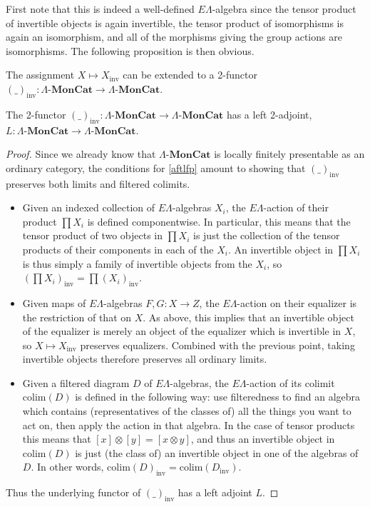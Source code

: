 \documentclass{amsbook} %
\newcommand{\mb}{\mathbf}
\newcommand{\ELAlg}{\lmc}
\newcommand{\lmc}{\Lambda\mbox{-}\mb{MonCat}}
\numberwithin{section}{chapter}
\begin{document}
First note that this is indeed a well-defined $E\Lambda$-algebra since the tensor product of invertible objects is again invertible, the tensor product of isomorphisms is again an isomorphism, and all of the morphisms giving the group actions are isomorphisms. The following proposition is then obvious.


\begin{prop} \label{invprop} The assignment $X \mapsto X_{\mathrm{inv}}$ can be extended to a 2-functor $(\_)_{\mathrm{inv}}: \ELAlg \to \ELAlg$.
\end{prop}


\begin{prop} \label{invadj} The 2-functor $(\_)_{\mathrm{inv}}: \ELAlg \to \ELAlg$ has a left 2-adjoint, $L: \ELAlg \to \ELAlg$.
\end{prop}
\begin{proof} Since we already know that $\ELAlg$ is locally finitely presentable as an ordinary category, the conditions for \cref{aftlfp} amount to showing that $(\_)_{\mathrm{inv}}$ preserves both limits and filtered colimits.
\begin{itemize}
\item Given an indexed collection of $E\Lambda$-algebras $X_i$, the $E\Lambda$-action of their product $\prod X_i$ is defined componentwise. In particular, this means that the tensor product of two objects in $\prod X_i$ is just the collection of the tensor products of their components in each of the $X_i$. An invertible object in $\prod X_i$ is thus simply a family of invertible objects from the $X_i$, so $(\prod X_i)_{\mathrm{inv}} = \prod (X_i)_{\mathrm{inv}}$.
\item Given maps of $E\Lambda$-algebras $F, G: X \to Z$,  the $E\Lambda$-action on their equalizer is the restriction of that on $X$. As above, this implies that an invertible object of the equalizer is merely an object of the equalizer which is invertible in $X$, so $X \mapsto X_{\mathrm{inv}}$ preserves equalizers. Combined with the previous point, taking invertible objects therefore preserves all ordinary limits.
\item Given a filtered diagram $D$ of $E\Lambda$-algebras, the $E\Lambda$-action of its colimit $\mathrm{colim}(D)$ is defined in the following way: use filteredness to find an algebra which contains (representatives of the classes of) all the things you want to act on, then apply the action in that algebra. In the case of tensor products this means that $[x]\otimes[y] = [x \otimes y]$, and thus an invertible object in $\mathrm{colim}(D)$ is just (the class of) an invertible object in one of the algebras of $D$. In other words, $\mathrm{colim}(D)_{\mathrm{inv}} = \mathrm{colim}(D_{\mathrm{inv}})$.
\end{itemize}
Thus the underlying functor of $(\_)_{\mathrm{inv}}$ has a left adjoint $L$.


\end{proof}
\end{document}

